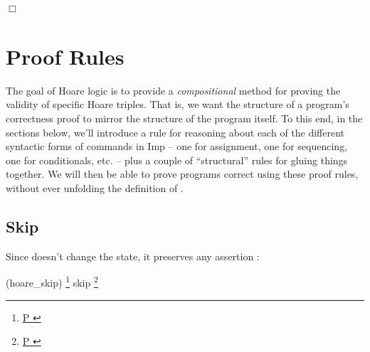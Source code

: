 \documentclass[12pt]{report}
\begin{document}
\ensuremath{\Box} 
\begin{coqdoccode}
\coqdocemptyline
\end{coqdoccode}
\section{Proof Rules}



 The goal of Hoare logic is to provide a \textit{compositional}
    method for proving the validity of specific Hoare triples.  That
    is, we want the structure of a program's correctness proof to
    mirror the structure of the program itself.  To this end, in the
    sections below, we'll introduce a rule for reasoning about each of
    the different syntactic forms of commands in Imp -- one for
    assignment, one for sequencing, one for conditionals, etc. -- plus
    a couple of ``structural'' rules for gluing things together.  We
    will then be able to prove programs correct using these proof
    rules, without ever unfolding the definition of . 
\begin{coqdoccode}
\coqdocemptyline
\end{coqdoccode}
\subsection{Skip}



 Since  doesn't change the state, it preserves any
    assertion :
\par
\noindent\hrulefill\par
\noindent{}  (hoare\_skip)
      \footnote{\url{ P }} skip \footnote{\url{ P }}
\end{document}
